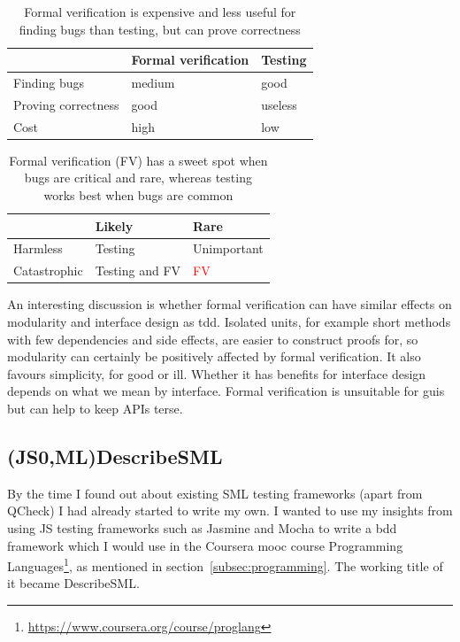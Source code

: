\documentclass[11pt]{article}
\begin{document}
\begin{table}
  \centering
    \begin{tabular}{ l | l l}
    & Formal verification & Testing \\ \hline
    Finding bugs & medium & good \\
    Proving correctness & good & useless \\
    Cost & high & low \\
    \end{tabular}
  \caption{Formal verification is expensive and less useful for finding bugs than testing, but can prove correctness}
  \label{tab:fvt}
\end{table}

\begin{table}
  \centering
    \begin{tabular}{ l | l l}
    & Likely & Rare \\ \hline
    Harmless & Testing & Unimportant \\
    Catastrophic & Testing and FV & \textcolor{red}{FV} \\
    \end{tabular}
  \caption{Formal verification (FV) has a sweet spot when bugs are critical and rare, whereas testing works best when bugs are common}
  \label{tab:fvt2}
\end{table}

An interesting discussion is whether formal verification can have similar effects on modularity and interface design as \gls{tdd}. Isolated units, for example short methods with few dependencies and side effects, are easier to construct proofs for, so modularity can certainly be positively affected by formal verification. It also favours simplicity, for good or ill. Whether it has benefits for interface design depends on what we mean by interface. Formal verification is unsuitable for \glspl{gui} but can help to keep APIs terse.


\subsection{(JS0,ML)DescribeSML}
\label{subsec:describesml}

By the time I found out about existing SML testing frameworks (apart from QCheck) I had already started to write my own. I wanted to use my insights from using JS testing frameworks such as Jasmine and Mocha to write a \gls{bdd} framework which I would use in the Coursera \gls{mooc} course Programming Languages\footnote{\url{https://www.coursera.org/course/proglang}}, as mentioned in section~\ref{subsec:programming}. The working title of it became DescribeSML.
\end{document}
